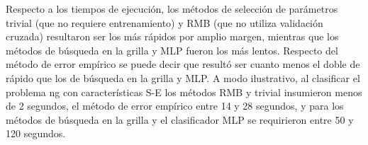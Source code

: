 \documentclass[12pt,bibliography=oldstyle,DIV=12,parskip=half-]{scrreprt}
\begin{document}
Respecto a los tiempos de ejecución, los métodos de selección de
parámetros trivial (que no requiere entrenamiento) y RMB (que no
utiliza validación cruzada) resultaron ser los más rápidos por amplio
margen, mientras que los métodos de búsqueda en la grilla y MLP fueron
los más lentos.  Respecto del método de error empírico se puede decir
que resultó ser cuanto menos el doble de rápido que los de búsqueda en
la grilla y MLP. A modo ilustrativo, al clasificar el problema ng con
características S-E los métodos RMB y trivial insumieron menos de 2
segundos, el método de error empírico entre 14 y 28 segundos, y para
los métodos de búsqueda en la grilla y el
clasificador MLP se requirieron entre 50 y 120 segundos.


\end{document}
